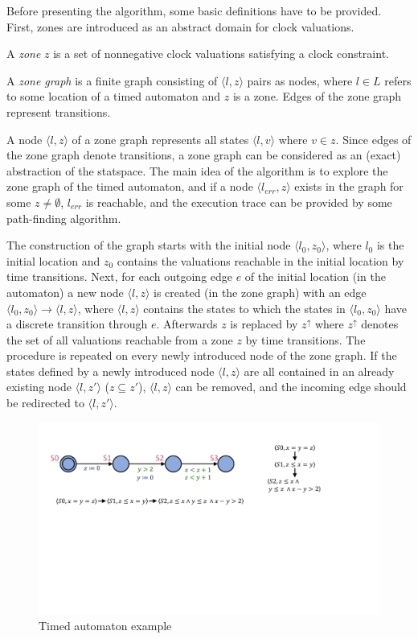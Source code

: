 Before presenting the algorithm, some basic definitions have to be provided. First, zones are introduced as an abstract domain for clock valuations.

\begin{dfn}
	A \emph{zone} $z$ is a set of nonnegative clock valuations satisfying a clock constraint.
\end{dfn}


\begin{dfn}
	A \emph{zone graph} is a finite graph consisting of $\langle l,z \rangle$ pairs as nodes, where $l \in L$ refers to some location of a timed automaton and $z$ is a zone. Edges of the zone graph represent transitions. 
\end{dfn}

A node $\langle l,z \rangle$ of a zone graph represents all states $\langle l,v \rangle$ where $v \in z$. Since edges of the zone graph denote transitions, a zone graph can be considered as an (exact) abstraction of the statspace. The main idea of the algorithm is to explore the zone graph of the timed automaton, and if a node $\langle l_{err},z \rangle$ exists in the graph for some $z \neq \emptyset$, $l_{err}$ is reachable, and the execution trace can be provided by some path-finding algorithm.

The construction of the graph starts with the initial node  $\langle l_0,z_0 \rangle$,
where $l_0$ is the initial location and $z_0$ contains the valuations reachable in the initial location by time transitions. 
Next, for each outgoing edge $e$ of the initial location (in the automaton) a new node  $\langle l,z \rangle$ is created (in the zone graph) with an edge
$\langle l_0,z_0 \rangle \to \langle l,z \rangle$, where $\langle l,z \rangle$ contains the states to which the states in $\langle l_0,z_0 \rangle$ have a discrete transition through $e$. Afterwards $z$ is replaced by $z^\uparrow$ where $z^\uparrow$ denotes the set of all valuations reachable from a zone $z$ by time transitions.  The procedure is repeated on every newly introduced node of the zone graph. If the states defined by a newly introduced node $\langle l,z \rangle$ are all contained in an already existing node $\langle l,z' \rangle$ ($z \subseteq z'$), $\langle l,z \rangle$ can be removed, and the incoming edge should be redirected to $\langle l,z' \rangle$.

\begin{figure} 
	\centering
	\includegraphics[width=.7\textwidth]{include/figures/splitexample_aut}
	\caption{Timed automaton example}
	\label{fig:splitex}
\end{figure}

